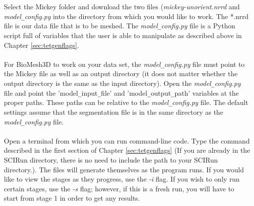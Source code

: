 \documentclass[fleqn,12pt,openany]{book}
\begin{document}
Select the Mickey folder and download the two files 
(\emph{mickey-unorient.nrrd} and \emph{model}\verb+_+\emph{config.py} into the 
directory from which you would like to work. The *.nrrd file is our data file 
that is to be meshed. The \emph{model}\verb+_+\emph{config.py} file is a 
Python script full of variables that the user is able to manipulate as described 
above in Chapter \ref{sec:tetgenflags}.

\paragraph{}
For BioMesh3D to work on your data set, the \emph{model}\verb+_+\emph{config.py} 
file must point to the Mickey file as well as an output directory (it does not 
matter whether the output directory is the same as the input directory). Open 
the \emph{model}\verb+_+\emph{config.py} file and point the 
'model\verb+_+input\verb+_+file' and 'model\verb+_+output\verb+_+path' 
variables at the proper paths. These paths can be relative to the \emph{model}\verb+_+\emph{config.py} file.
The default settings assume that the segmentation file is in the same directory
as the \emph{model}\verb+_+\emph{config.py} file.


\paragraph{}
Open a terminal from which you can run command-line code. Type the command 
described in the first section of Chapter \ref{sec:tetgenflags} (If you are 
already in the SCIRun directory, there is no need to include the path to your 
SCIRun directory.). The files will generate themselves as the program runs.  
If you would like to view the stages as they progress, use the \emph{-i} flag.  
If you wish to only run certain stages, use the \emph{-s} flag; however, if this 
is a fresh run, you will have to start from stage 1 in order to get any results.
\end{document}
